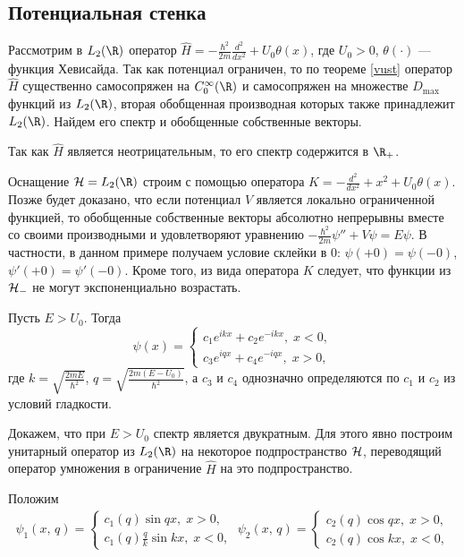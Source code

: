 \documentclass[a4paper
]{article}
\begin{document}
\subsection{Потенциальная стенка}
Рассмотрим в $L_2(\R)$ оператор $\hat H=-\frac{\hbar^2}{2m}\frac{d^2}
{dx^2}+U_0\theta(x)$, где $U_0>0$, $\theta(\cdot)$ --- функция Хевисайда.
Так как потенциал ограничен, то по теореме \ref{vust} оператор $\hat H$
существенно самосопряжен на $C_0^\infty(\R)$ и самосопряжен на множестве $D_{\max}$
функций из $L_2(\R)$, вторая обобщенная производная которых также принадлежит
$L_2(\R)$. Найдем его спектр и обобщенные собственные векторы. \par
Так как $\hat H$ является неотрицательным, то его спектр содержится
в $\R_+$. \par
Оснащение ${\cal H}=L_2(\R)$ строим с помощью оператора $K=-\frac{d^2}{dx^2}
+x^2+U_0\theta(x)$. Позже будет доказано, что если потенциал $V$
является локально ограниченной функцией, то обобщенные собственные
векторы абсолютно непрерывны вместе со своими производными и удовлетворяют
уравнению $-\frac{\hbar^2}{2m}\psi''+V\psi=E\psi$. В частности, в
данном примере получаем условие склейки в 0: $\psi(+0)=\psi(-0)$,
$\psi'(+0)=\psi'(-0)$. Кроме того, из вида оператора $K$ следует, что
функции из ${\cal H}_-$ не могут экспоненциально возрастать. \par
Пусть $E>U_0$. Тогда $$\psi(x)=\left\{ \begin{array}{l} c_1e^{ikx}+
c_2e^{-ikx}, \; x<0, \\ c_3e^{iqx}+c_4e^{-iqx}, \; x>0,\end{array}\right.$$
где $k=\sqrt{\frac{2mE}{\hbar^2}}$, $q=\sqrt{\frac{2m(E-U_0)}{\hbar^2}}$,
а $c_3$ и $c_4$ однозначно определяются по $c_1$ и $c_2$ из условий
гладкости. \par
Докажем, что при $E>U_0$ спектр является двукратным. Для этого явно построим
унитарный оператор из $L_2(\R)$ на некоторое подпространство ${\cal H}$,
переводящий оператор умножения в ограничение $\hat H$ на это подпространство.
\par
Положим
\begin{align}
\label{stenka_psij}
\psi_1(x, \, q)=\left\{ \begin{array}{l} c_1(q)\sin qx, \; x>0, \\
c_1(q)\frac{q}{k}\sin kx,\; x<0,\end{array} \right. \; \psi_2(x, \, q)=\left\{
\begin{array}{l} c_2(q)\cos qx, \; x>0, \\ c_2(q)\cos kx,\; x<0,\end{array} \right.
\end{align}
\end{document}
